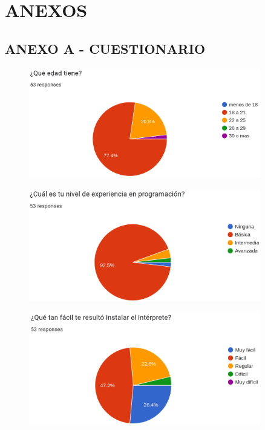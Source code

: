 \renewcommand{\chaptername}{}
\renewcommand{\thesection}{}
\chapter*{ANEXOS}

\section*{ANEXO A - CUESTIONARIO}
\begin{figure}[!h]
  \includegraphics*[width=0.9\textwidth]{images/ap01.png}
\end{figure}
\begin{figure}[!h]
  \includegraphics*[width=0.9\textwidth]{images/ap02.png}
\end{figure}
\begin{figure}[!h]
  \includegraphics*[width=0.9\textwidth]{images/ap03.png}
\end{figure}
